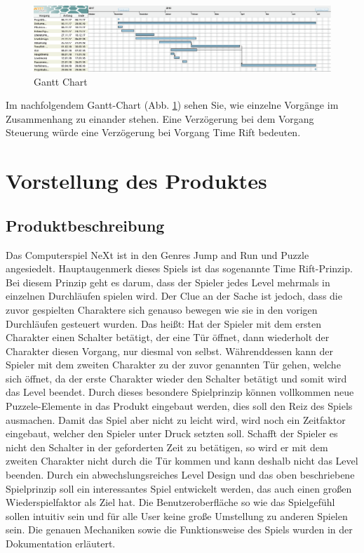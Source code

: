 \begin{figure}
	\centering
	\includegraphics[width=20cm]{images/Gantt.png}
	\caption{Gantt Chart}
	\label{Gantt-Chart}
\end{figure}
Im nachfolgendem Gantt-Chart (Abb. \ref{Gantt-Chart}) sehen Sie, wie einzelne Vorgänge im Zusammenhang zu einander stehen. Eine Verzögerung bei dem Vorgang Steuerung würde eine Verzögerung bei Vorgang Time Rift bedeuten.
\chapter{Vorstellung des Produktes}
\section{Produktbeschreibung}
Das Computerspiel NeXt ist in den Genres Jump and Run und Puzzle angesiedelt. Hauptaugenmerk dieses Spiels ist das sogenannte Time Rift-Prinzip. Bei diesem Prinzip geht es darum, dass der Spieler jedes Level mehrmals in einzelnen Durchläufen spielen wird. Der Clue an der Sache ist jedoch, dass die zuvor gespielten Charaktere sich genauso bewegen wie sie in den vorigen Durchläufen gesteuert wurden. Das heißt: Hat der Spieler mit dem ersten Charakter einen Schalter betätigt, der eine Tür öffnet, dann wiederholt der Charakter diesen Vorgang, nur diesmal von selbst. Währenddessen kann der Spieler mit dem zweiten Charakter zu der zuvor genannten Tür gehen, welche sich öffnet, da der erste Charakter wieder den Schalter betätigt und somit wird das Level beendet. Durch dieses besondere Spielprinzip können vollkommen neue Puzzele-Elemente in das Produkt eingebaut werden, dies soll den Reiz des Spiels ausmachen. Damit das Spiel aber nicht zu leicht wird, wird noch ein Zeitfaktor eingebaut, welcher den Spieler unter Druck setzten soll. Schafft der Spieler es nicht den Schalter in der geforderten Zeit zu betätigen, so wird er mit dem zweiten Charakter nicht durch die Tür kommen und kann deshalb nicht das Level beenden. Durch ein abwechslungsreiches Level Design und das oben beschriebene Spielprinzip soll ein interessantes Spiel entwickelt werden, das auch einen großen Wiederspielfaktor als Ziel hat. Die Benutzeroberfläche so wie das Spielgefühl sollen intuitiv sein und für alle User keine große Umstellung zu anderen Spielen sein. Die genauen Mechaniken sowie die Funktionsweise des Spiels wurden in der Dokumentation erläutert.  
